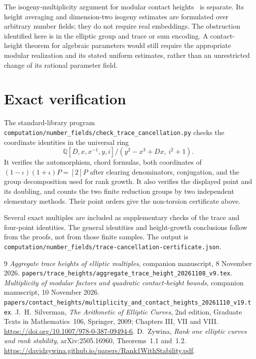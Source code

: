 \documentclass[11pt,a4paper]{article}
\newcommand{\Q}{\mathbb Q}\newcommand{\Z}{\mathbb Z}
\begin{document}
The isogeny-multiplicity argument for modular contact heights~\cite{Multiplicity} is
separate. Its height averaging and dimension-two isogeny estimates
are formulated over arbitrary number fields; they do not require
real embeddings. The obstruction identified here is in the
elliptic group and trace or sum encoding. A contact-height theorem
for algebraic parameters would still require the appropriate
modular realization and its stated uniform estimates, rather than
an unrestricted change of its rational parameter field.

\section{Exact verification}

The standard-library program
\nolinkurl{computation/number_fields/check_trace_cancellation.py}
checks the coordinate identities in the universal ring
\[
 \Q[D,x,x^{-1},y,i]/(y^2-x^3+Dx,\ i^2+1).
\]
It verifies the automorphism, chord formulas, both coordinates of
$(1-\iota)(1+\iota)P=[2]P$ after clearing denominators, conjugation,
and the group decomposition used for rank growth. It also verifies
the displayed point and its doubling, and counts the two
finite reduction groups by two independent elementary methods.
Their point orders give the non-torsion certificate above.

Several exact multiples are included as supplementary checks of
the trace and four-point identities. The general identities and
height-growth conclusions follow from the proofs, not from those
finite samples. The output is
\nolinkurl{computation/number_fields/trace-cancellation-certificate.json}.

\begin{thebibliography}{9}
\emph{Aggregate trace heights of elliptic multiples},
companion manuscript, 8 November 2026.
\nolinkurl{papers/trace_heights/aggregate_trace_height_20261108_v9.tex}.
\emph{Multiplicity of modular factors and quadratic contact-height bounds},
companion manuscript, 10 November 2026.
\nolinkurl{papers/contact_heights/multiplicity_and_contact_heights_20261110_v19.tex}.
J.~H.~Silverman, \emph{The Arithmetic of Elliptic Curves},
2nd edition, Graduate Texts in Mathematics~106, Springer, 2009;
Chapters III, VII and VIII.
\url{https://doi.org/10.1007/978-0-387-09494-6}.
D.~Zywina, \emph{Rank one elliptic curves and rank stability},
arXiv:2505.16960, Theorems~1.1 and~1.2.
\url{https://davidzywina.github.io/papers/Rank1WithStability.pdf}.
\end{thebibliography}
\end{document}
